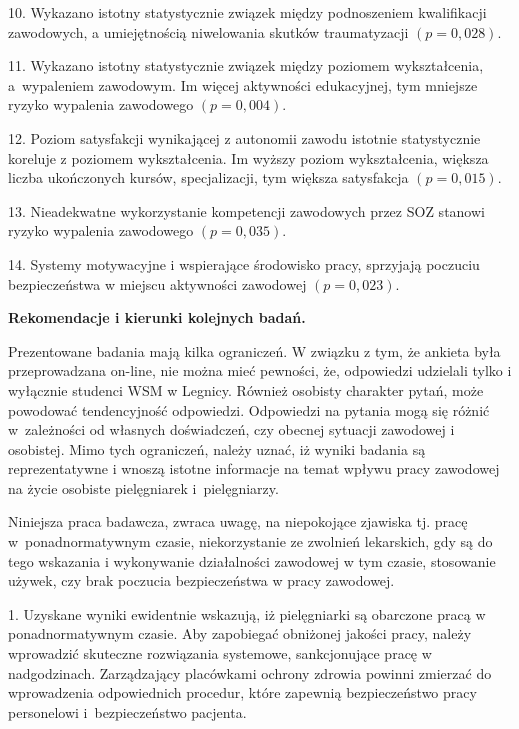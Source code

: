 \documentclass[a4paper,12pt,twoside,openright]{mwrep}
\begin{document}
10. Wykazano istotny statystycznie związek między podnoszeniem kwalifikacji zawodowych, a umiejętnością niwelowania skutków traumatyzacji $(p=0,028)$.

11. Wykazano istotny statystycznie związek między poziomem wykształcenia, a~wypaleniem zawodowym. Im więcej aktywności edukacyjnej, tym mniejsze ryzyko wypalenia zawodowego $(p=0,004)$.


12. Poziom satysfakcji wynikającej z autonomii zawodu istotnie statystycznie koreluje z poziomem wykształcenia. Im wyższy poziom wykształcenia, większa liczba ukończonych kursów, specjalizacji, tym większa satysfakcja $(p = 0,015)$.

13. Nieadekwatne wykorzystanie kompetencji zawodowych przez SOZ stanowi ryzyko wypalenia zawodowego $ (p = 0,035)$.

14.  Systemy motywacyjne i  wspierające środowisko pracy, sprzyjają poczuciu bezpieczeństwa w miejscu aktywności zawodowej $(p = 0,023)$.



\vspace{\baselineskip} 
\large
\textbf{Rekomendacje i kierunki kolejnych badań.}
\normalsize
\vspace{\baselineskip} 



Prezentowane badania mają kilka ograniczeń. W związku z tym, że ankieta była przeprowadzana on-line, nie można mieć pewności, że, odpowiedzi udzielali tylko i wyłącznie studenci WSM w Legnicy. Również osobisty charakter pytań, może powodować tendencyjność odpowiedzi. Odpowiedzi na pytania mogą się różnić w~zależności od własnych doświadczeń,  czy obecnej sytuacji zawodowej i osobistej. Mimo tych ograniczeń, należy uznać, iż wyniki badania są reprezentatywne i wnoszą istotne informacje na temat wpływu pracy zawodowej na życie osobiste pielęgniarek i~pielęgniarzy.


Niniejsza praca badawcza, zwraca uwagę, na niepokojące zjawiska tj. pracę w~ponadnormatywnym czasie, niekorzystanie ze zwolnień lekarskich, gdy są do tego wskazania i wykonywanie działalności zawodowej w tym czasie, stosowanie używek, czy brak poczucia bezpieczeństwa w pracy zawodowej.

1.	 Uzyskane wyniki ewidentnie wskazują, iż pielęgniarki są obarczone pracą w ponadnormatywnym czasie. Aby zapobiegać obniżonej jakości pracy, należy wprowadzić skuteczne rozwiązania systemowe, sankcjonujące pracę w nadgodzinach. Zarządzający placówkami ochrony zdrowia powinni zmierzać do wprowadzenia odpowiednich procedur, które zapewnią bezpieczeństwo pracy personelowi i~bezpieczeństwo pacjenta.
\end{document}
